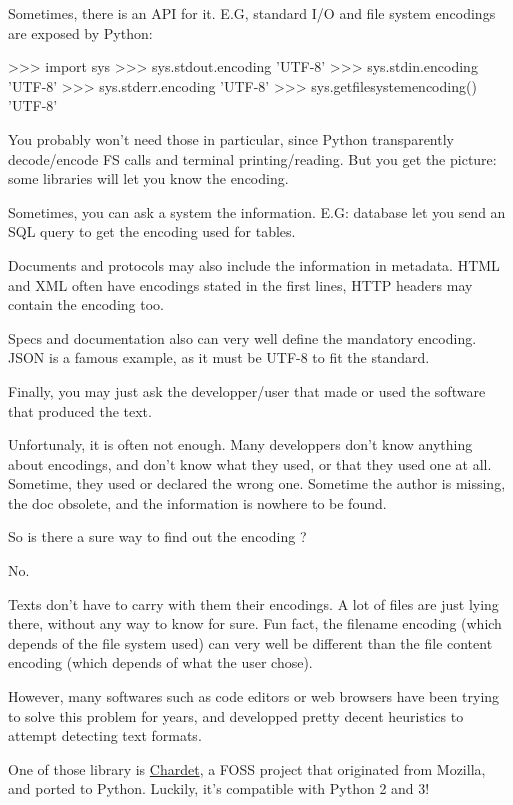 Sometimes, there is an API for it. E.G, standard I/O and file system encodings are exposed by Python:

\begin{py2and3}
>>> import sys
>>> sys.stdout.encoding
'UTF-8'
>>> sys.stdin.encoding
'UTF-8'
>>> sys.stderr.encoding
'UTF-8'
>>> sys.getfilesystemencoding()
'UTF-8'
\end{py2and3}

You probably won't need those in particular, since Python transparently decode/encode FS calls and terminal printing/reading. But you get the picture: some libraries will let you know the encoding.

Sometimes, you can ask a system the information. E.G: database let you send an SQL query to get the encoding used for tables.

Documents and protocols may also include the information in metadata. HTML and XML often have encodings stated in the first lines, HTTP headers may contain the encoding too.

Specs and documentation also can very well define the mandatory encoding. JSON is a famous example, as it must be UTF-8 to fit the standard.

Finally, you may just ask the developper/user that made or used the software that produced the text.

Unfortunaly, it is often not enough. Many developpers don't know anything about encodings, and don't know what they used, or that they used one at all. Sometime, they used or declared the wrong one. Sometime the author is missing, the doc obsolete, and the information is nowhere to be found.

So is there a sure way to find out the encoding ?

No.

Texts don't have to carry with them their encodings. A lot of files are just lying there, without any way to know for sure. Fun fact, the filename encoding (which depends of the file system used) can very well be different than the file content encoding (which depends of what the user chose).

However, many softwares such as code editors or web browsers have been trying to solve this problem for years, and developped pretty decent heuristics to attempt detecting text formats.

One of those library is \href{https://pypi.org/project/chardet/}{Chardet}, a FOSS project that originated from Mozilla, and ported to Python. Luckily, it's compatible with Python 2 and 3!

